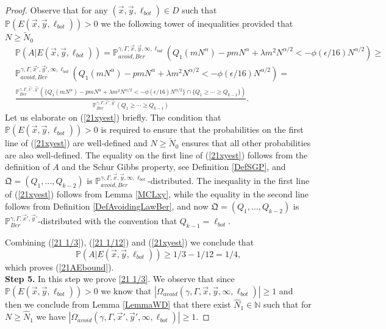 \begin{proof}
	Observe that for any $(\vec{x}, \vec{y}, \ell_{bot}) \in D$ such that $\mathbb{P}(E(\vec{x},\vec{y},\ell_{bot})) > 0$ we the following tower of inequalities provided that $N \geq \tilde{N}_0$
	\begin{equation}\label{21xyest}
		\begin{split}
			&\mathbb{P}(A| E(\vec{x},\vec{y},\ell_{bot})) = \mathbb{P}^{\gamma, \Gamma,\vec{x},\vec{y},\infty,\ell_{bot}}_{avoid,Ber} \left( Q_1\left(mN^{\alpha}\right) - pm N^\alpha  + \lambda m^2 N^{\alpha/2} < -\phi(\epsilon/16)N^{\alpha/2} \right) \geq  \\
			& \mathbb{P}^{\gamma, \Gamma,\vec{x}',\vec{y}',\infty,\ell_{bot}}_{avoid,Ber} \left( Q_1\left(mN^{\alpha}\right) - pm N^\alpha  + \lambda m^2 N^{\alpha/2} < -\phi(\epsilon/16)N^{\alpha/2} \right) = \\
			&\frac{\mathbb{P}^{\gamma, \Gamma,\vec{x}',\vec{y}'}_{Ber} \left( \{ Q_1\left(mN^{\alpha}\right) - pm N^\alpha  + \lambda m^2 N^{\alpha/2} < -\phi(\epsilon/16)N^{\alpha/2} \} \cap \{Q_1 \geq \cdots \geq Q_{k-1} \} \right) }{\mathbb{P}^{\gamma, \Gamma,\vec{x}',\vec{y}'}_{Ber} \left( Q_1 \geq \cdots \geq Q_{k-1} \right) }.
		\end{split}
	\end{equation}
	Let us elaborate on (\ref{21xyest}) briefly. The condition that $\mathbb{P}(E(\vec{x},\vec{y},\ell_{bot})) > 0$ is required to ensure that the probabilities on the first line of (\ref{21xyest}) are well-defined and $N \geq \tilde{N}_0$ ensures that all other probabilities are also well-defined. The equality on the first line of (\ref{21xyest}) follows from the definition of $A$ and the Schur Gibbs property, see Definition \ref{DefSGP}, and $\mathfrak{Q} = (Q_1, \dots, Q_{k-2})$ is $\mathbb{P}^{\gamma, \Gamma,\vec{x},\vec{y},\infty,\ell_{bot}}_{avoid,Ber} $-distributed. The inequality in the first line of (\ref{21xyest}) follows from  Lemma \ref{MCLxy}, while the equality in the second line follows from Definition \ref{DefAvoidingLawBer}, and now $\mathfrak{Q} = (Q_1, \dots, Q_{k-2})$ is $\mathbb{P}^{\gamma, \Gamma,\vec{x}',\vec{y}'}_{Ber}$-distributed with the convention that $Q_{k-1} = \ell_{bot}$. 
	
	Combining (\ref{21 1/3}), (\ref{21 1/12}) and (\ref{21xyest}) we conclude that 
	$$\mathbb{P}(A| E(\vec{x},\vec{y},\ell_{bot}))  \geq 1/3- 1/12 = 1/4,$$
	which proves (\ref{21AEbound}).\\
	
	\noindent\textbf{Step 5.} In this step we prove \eqref{21 1/3}. We observe that since $\mathbb{P}(E(\vec{x},\vec{y},\ell_{bot})) > 0$ we know that $|\Omega_{avoid}(\gamma, \Gamma, \vec{x}, \vec{y}, \infty, \ell_{bot})| \geq 1$ and then we conclude from Lemma \ref{LemmaWD} that there exist $\hat{N}_1 \in \mathbb{N}$ such that for $N \geq \hat{N}_1$ we have $|\Omega_{avoid}(\gamma, \Gamma, \vec{x}', \vec{y}', \infty, \ell_{bot})| \geq 1$.
	

\end{proof}
